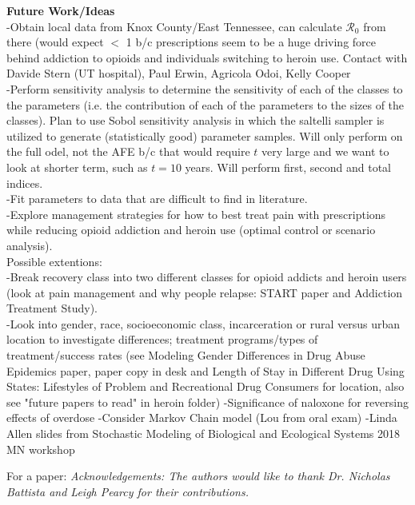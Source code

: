 \documentclass[12pt]{article}
\begin{document}

\textbf{Future Work/Ideas} \\
-Obtain local data from Knox County/East Tennessee, can calculate $\mathscr{R}_0$ from there (would expect $<$ 1 b/c prescriptions seem to be a huge driving force behind addiction to opioids and individuals switching to heroin use. Contact with Davide Stern (UT hospital), Paul Erwin, Agricola Odoi, Kelly Cooper\\
-Perform sensitivity analysis to determine the sensitivity of each of the classes to the parameters (i.e. the contribution of each of the parameters to the sizes of the classes). Plan to use Sobol sensitivity analysis in which the saltelli sampler is utilized to generate (statistically good) parameter samples. Will only perform on the full  odel, not the AFE b/c that would require $t$ very large and we want to look at shorter term, such as $t=10$ years. Will perform first, second and total indices. \\
-Fit parameters to data that are difficult to find in literature. \\
-Explore management strategies for how to best treat pain with prescriptions while reducing opioid addiction and heroin use (optimal control or scenario analysis).  \\
Possible extentions: \\
-Break recovery class into two different classes for opioid addicts and heroin users (look at pain management and why people relapse: START paper and Addiction Treatment Study). \\
-Look into gender, race, socioeconomic class, incarceration or rural versus urban location to investigate differences; treatment programs/types of treatment/success rates (see Modeling Gender Differences in Drug Abuse Epidemics paper, paper copy in desk and Length of Stay in Different Drug Using States: Lifestyles of Problem and Recreational Drug Consumers for location, also see "future papers to read" in heroin folder)
-Significance of naloxone for reversing effects of overdose 
-Consider Markov Chain model (Lou from oral exam) 
-Linda Allen slides from Stochastic Modeling of Biological and Ecological Systems 2018 MN workshop 

For a paper: \textit{Acknowledgements: The authors would like to thank Dr. Nicholas Battista and Leigh Pearcy for their contributions.}
\end{document}

